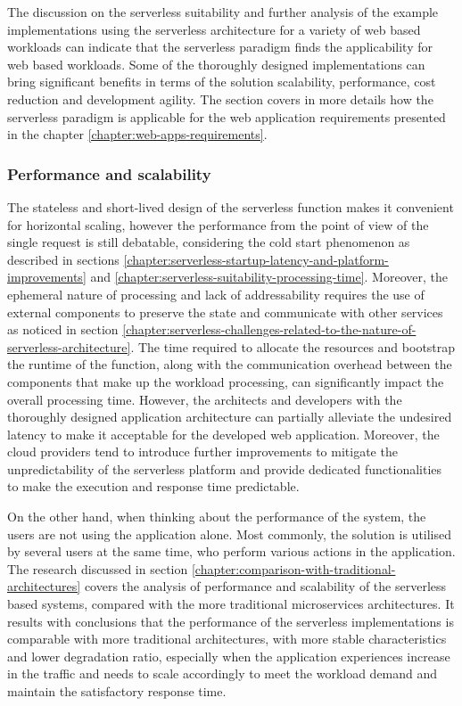 The discussion on the serverless suitability and further analysis of the example implementations using the serverless architecture for a variety of web based workloads can indicate that the serverless paradigm finds the applicability for web based workloads.
Some of the thoroughly designed implementations can bring significant benefits in terms of the solution scalability, performance, cost reduction and development agility.
The section covers in more details how the serverless paradigm is applicable for the web application requirements presented in the chapter \ref{chapter:web-apps-requirements}.

\subsubsection{Performance and scalability} \label{chapter:serverless-suitability-performance-and-scalability}

The stateless and short-lived design of the serverless function makes it convenient for horizontal scaling, however the performance from the point of view of the single request is still debatable, considering the cold start phenomenon as described in sections  \ref{chapter:serverless-startup-latency-and-platform-improvements} and \ref{chapter:serverless-suitability-processing-time}.
Moreover, the ephemeral nature of processing and lack of addressability requires the use of external components to preserve the state and communicate with other services as noticed in section \ref{chapter:serverless-challenges-related-to-the-nature-of-serverless-architecture}.
The time required to allocate the resources and bootstrap the runtime of the function, along with the communication overhead between the components that make up the workload processing, can significantly impact the overall processing time.
However, the architects and developers with the thoroughly designed application architecture can partially alleviate the undesired latency to make it acceptable for the developed web application.
Moreover, the cloud providers tend to introduce further improvements to mitigate the unpredictability of the serverless platform and provide dedicated functionalities to make the execution and response time predictable.

On the other hand, when thinking about the performance of the system, the users are not using the application alone.
Most commonly, the solution is utilised by several users at the same time, who perform various actions in the application.
The research discussed in section \ref{chapter:comparison-with-traditional-architectures} covers the analysis of performance and scalability of the serverless based systems, compared with the more traditional microservices architectures.
It results with conclusions that the performance of the serverless implementations is comparable with more traditional architectures, with more stable characteristics and lower degradation ratio, especially when the application experiences increase in the traffic and needs to scale accordingly to meet the workload demand and maintain the satisfactory response time.


